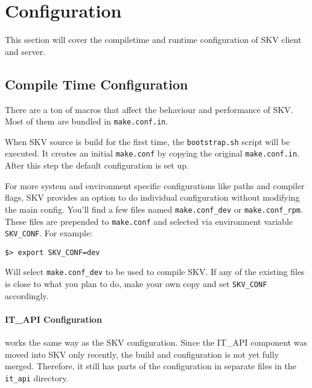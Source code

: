 %

\section{Configuration}\label{sec:skv:config}
This section will cover the compiletime and runtime configuration of
SKV client and server.

\subsection{Compile Time Configuration}\label{sec:skv:config:cmp}
There are a ton of macros that affect the behaviour and performance of
SKV.  Most of them are bundled in \verb|make.conf.in|.

When SKV source is build for the first time, the \verb|bootstrap.sh|
script will be executed.  It creates an initial \verb|make.conf| by
copying the original \verb|make.conf.in|.  After this step the default
configuration is set up.

For more system and environment specific configurations like paths and
compiler flags, SKV provides an option to do individual configuration
without modifying the main config.  You'll find a few files named
\verb|make.conf_dev| or \verb|make.conf_rpm|.  These files are
prepended to \verb|make.conf| and selected via environment variable
\verb|SKV_CONF|.  For example:

\begin{verbatim}
$> export SKV_CONF=dev
\end{verbatim}
 
Will select \verb|make.conf_dev| to be used to compile SKV.  If any of
the existing files is close to what you plan to do, make your own copy
and set \verb|SKV_CONF| accordingly.


\paragraph{IT\_API Configuration} works the same way as the SKV
configuration.  Since the IT\_API component was moved into SKV only
recently, the build and configuration is not yet fully merged.
Therefore, it still has parts of the configuration in separate files
in the \verb|it_api| directory.



